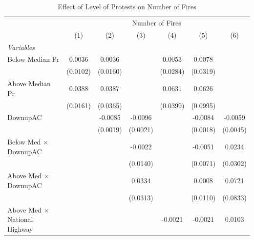 
\begin{table}[htbp]
   \caption{\label{tab:protest_treat_main} Effect of Level of Protests on Number of Fires}
   \centering
   \begin{tabular}{lcccccc}
      \tabularnewline \midrule \midrule
       & \multicolumn{6}{c}{Number of Fires}\\
                                                              & (1)           & (2)           & (3)           & (4)           & (5)           & (6)\\  
      \midrule
      \emph{Variables}\\
      Below Median Pr                                         & 0.0036        & 0.0036        &               & 0.0053        & 0.0078        &   \\   
                                                              & (0.0102)      & (0.0160)      &               & (0.0284)      & (0.0319)      &   \\   
      Above Median Pr                                         & 0.0388        & 0.0387        &               & 0.0631        & 0.0626        &   \\   
                                                              & (0.0161)      & (0.0365)      &               & (0.0399)      & (0.0995)      &   \\   
      DownupAC                                                &               & -0.0085       & -0.0096       &               & -0.0084       & -0.0059\\   
                                                              &               & (0.0019)      & (0.0021)      &               & (0.0018)      & (0.0045)\\   
      Below Med $\times$ DownupAC                             &               &               & -0.0022       &               & -0.0051       & 0.0234\\   
                                                              &               &               & (0.0140)      &               & (0.0071)      & (0.0302)\\   
      Above Med $\times$ DownupAC                             &               &               & 0.0334        &               & 0.0008        & 0.0721\\   
                                                              &               &               & (0.0313)      &               & (0.0110)      & (0.0833)\\   
      Above Med $\times$ National Highway                     &               &               &               & -0.0021       & -0.0021       & 0.0103\\   

\end{tabular}
\end{table}
